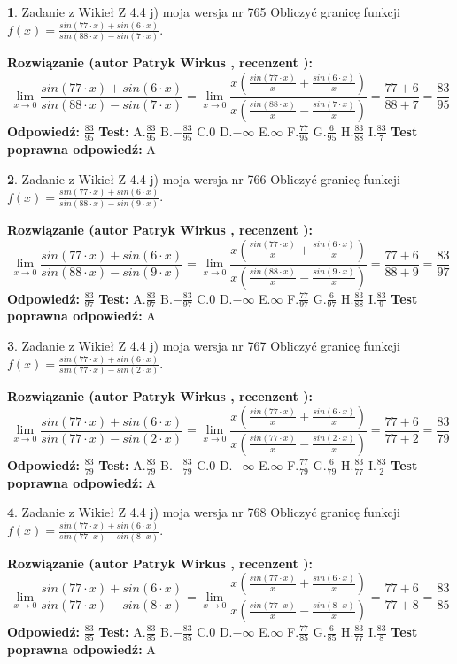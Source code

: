 \documentclass[12pt, a4paper]{article}
\theoremstyle{definition} %
\newtheorem{zad}{}
\newcommand{\zadStart}[1]{\begin{zad}#1\newline}
\newcommand{\zadStop}{\end{zad}}
\newcommand{\rozwStart}[2]{\noindent \textbf{Rozwiązanie (autor #1 , recenzent #2): }\newline}
\newcommand{\rozwStop}{\newline}
\newcommand{\odpStart}{\noindent \textbf{Odpowiedź:}\newline}
\newcommand{\odpStop}{\newline}
\newcommand{\testStart}{\noindent \textbf{Test:}\newline}
\newcommand{\testStop}{\newline}
\newcommand{\kluczStart}{\noindent \textbf{Test poprawna odpowiedź:}\newline}
\newcommand{\kluczStop}{\newline}
\begin{document}
\zadStart{Zadanie z Wikieł Z 4.4 j) moja wersja nr 765}
Obliczyć granicę funkcji $f(x)=\frac{sin(77\cdot x) +sin(6\cdot x)}{sin(88\cdot x) -sin(7\cdot x)}$.
\zadStop
\rozwStart{Patryk Wirkus}{}
$$\lim\limits_{x\to 0}\frac{sin(77\cdot x) +sin(6\cdot x)}{sin(88\cdot x) -sin(7\cdot x)}=\lim\limits_{x\to 0}\frac{x(\frac{sin(77\cdot x)}{x}+\frac{sin(6\cdot x)}{x})}{x(\frac{sin(88\cdot x)}{x}-\frac{sin(7\cdot x)}{x})}=\frac{77+6}{88+7} = \frac{83}{95}$$
\rozwStop
\odpStart
$\frac{83}{95}$
\odpStop
\testStart
A.$\frac{83}{95}$
B.$-\frac{83}{95}$
C.$0$
D.$-\infty$
E.$\infty$
F.$\frac{77}{95}$
G.$\frac{6}{95}$
H.$\frac{83}{88}$
I.$\frac{83}{7}$
\testStop
\kluczStart
A
\kluczStop



\zadStart{Zadanie z Wikieł Z 4.4 j) moja wersja nr 766}
Obliczyć granicę funkcji $f(x)=\frac{sin(77\cdot x) +sin(6\cdot x)}{sin(88\cdot x) -sin(9\cdot x)}$.
\zadStop
\rozwStart{Patryk Wirkus}{}
$$\lim\limits_{x\to 0}\frac{sin(77\cdot x) +sin(6\cdot x)}{sin(88\cdot x) -sin(9\cdot x)}=\lim\limits_{x\to 0}\frac{x(\frac{sin(77\cdot x)}{x}+\frac{sin(6\cdot x)}{x})}{x(\frac{sin(88\cdot x)}{x}-\frac{sin(9\cdot x)}{x})}=\frac{77+6}{88+9} = \frac{83}{97}$$
\rozwStop
\odpStart
$\frac{83}{97}$
\odpStop
\testStart
A.$\frac{83}{97}$
B.$-\frac{83}{97}$
C.$0$
D.$-\infty$
E.$\infty$
F.$\frac{77}{97}$
G.$\frac{6}{97}$
H.$\frac{83}{88}$
I.$\frac{83}{9}$
\testStop
\kluczStart
A
\kluczStop



\zadStart{Zadanie z Wikieł Z 4.4 j) moja wersja nr 767}
Obliczyć granicę funkcji $f(x)=\frac{sin(77\cdot x) +sin(6\cdot x)}{sin(77\cdot x) -sin(2\cdot x)}$.
\zadStop
\rozwStart{Patryk Wirkus}{}
$$\lim\limits_{x\to 0}\frac{sin(77\cdot x) +sin(6\cdot x)}{sin(77\cdot x) -sin(2\cdot x)}=\lim\limits_{x\to 0}\frac{x(\frac{sin(77\cdot x)}{x}+\frac{sin(6\cdot x)}{x})}{x(\frac{sin(77\cdot x)}{x}-\frac{sin(2\cdot x)}{x})}=\frac{77+6}{77+2} = \frac{83}{79}$$
\rozwStop
\odpStart
$\frac{83}{79}$
\odpStop
\testStart
A.$\frac{83}{79}$
B.$-\frac{83}{79}$
C.$0$
D.$-\infty$
E.$\infty$
F.$\frac{77}{79}$
G.$\frac{6}{79}$
H.$\frac{83}{77}$
I.$\frac{83}{2}$
\testStop
\kluczStart
A
\kluczStop



\zadStart{Zadanie z Wikieł Z 4.4 j) moja wersja nr 768}
Obliczyć granicę funkcji $f(x)=\frac{sin(77\cdot x) +sin(6\cdot x)}{sin(77\cdot x) -sin(8\cdot x)}$.
\zadStop
\rozwStart{Patryk Wirkus}{}
$$\lim\limits_{x\to 0}\frac{sin(77\cdot x) +sin(6\cdot x)}{sin(77\cdot x) -sin(8\cdot x)}=\lim\limits_{x\to 0}\frac{x(\frac{sin(77\cdot x)}{x}+\frac{sin(6\cdot x)}{x})}{x(\frac{sin(77\cdot x)}{x}-\frac{sin(8\cdot x)}{x})}=\frac{77+6}{77+8} = \frac{83}{85}$$
\rozwStop
\odpStart
$\frac{83}{85}$
\odpStop
\testStart
A.$\frac{83}{85}$
B.$-\frac{83}{85}$
C.$0$
D.$-\infty$
E.$\infty$
F.$\frac{77}{85}$
G.$\frac{6}{85}$
H.$\frac{83}{77}$
I.$\frac{83}{8}$
\testStop
\kluczStart
A
\kluczStop
\end{document}
